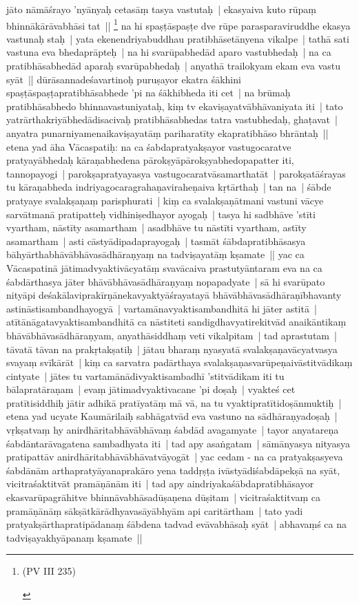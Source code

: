 \documentclass[article,12pt,a4paper]{memoir}
\begin{document}
	  \pstart jāto nāmāśrayo 'nyānyaḥ cetasāṃ tasya vastutaḥ | ekasyaiva kuto rūpaṃ bhinnākārāvabhāsi tat || \footnote{\begin{english}(PV III 235)\end{english}} \label{thakur75-60.29} na hi spaṣṭāspaṣṭe dve rūpe parasparaviruddhe ekasya vastunaḥ staḥ | yata ekenendriyabuddhau pratibhāsetānyena vikalpe | tathā sati vastuna eva bhedaprāpteḥ | na hi svarūpabhedād aparo vastubhedaḥ | na ca pratibhāsabhedād aparaḥ svarūpabhedaḥ | anyathā trailokyam ekam eva vastu syāt || \label{thakur75-61.3} dūrāsannadeśavartinoḥ puruṣayor ekatra śākhini spaṣṭāspaṣṭapratibhāsabhede 'pi na śākhibheda iti cet | na brūmaḥ pratibhāsabhedo bhinnavastuniyataḥ, kiṃ tv ekaviṣayatvābhāvaniyata iti | tato yatrārthakriyābhedādisacivaḥ pratibhāsabhedas tatra vastubhedaḥ, ghaṭavat | anyatra punarniyamenaikaviṣayatāṃ pariharatīty ekapratibhāso bhrāntaḥ || \label{thakur75-61.7} etena yad āha Vācaspatiḥ: na ca śabdapratyakṣayor vastugocaratve pratyayābhedaḥ kāraṇabhedena pārokṣyāpārokṣyabhedopapatter iti, tannopayogi | parokṣapratyayasya vastugocaratvāsamarthatāt | parokṣatāśrayas tu kāraṇabheda indriyagocaragrahaṇaviraheṇaiva kṛtārthaḥ | tan na | śābde pratyaye svalakṣaṇaṃ parisphurati | kiṃ ca svalakṣaṇātmani vastuni vācye sarvātmanā pratipatteḥ vidhiniṣedhayor ayogaḥ | tasya hi sadbhāve 'stīti vyartham, nāstīty asamartham | asadbhāve tu nāstīti vyartham, astīty asamartham | asti cāstyādipadaprayogaḥ | tasmāt śābdapratibhāsasya bāhyārthabhāvābhāvasādhāraṇyaṃ na tadviṣayatāṃ kṣamate || \label{thakur75-61.15} yac ca Vācaspatinā jātimadvyaktivācyatāṃ svavācaiva prastutyāntaram eva na ca śabdārthasya jāter bhāvābhāvasādhāraṇyaṃ nopapadyate | sā hi svarūpato nityāpi deśakālaviprakīrṇānekavyaktyāśrayatayā bhāvābhāvasādhāraṇībhavanty astināstisambandhayogyā | vartamānavyaktisambandhitā hi jāter astitā | atītānāgatavyaktisambandhitā ca nāstiteti sandigdhavyatirekitvād anaikāntikaṃ bhāvābhāvasādhāraṇyam, anyathāsiddhaṃ veti vikalpitam | tad aprastutam | tāvatā tāvan na prakṛtakṣatiḥ | jātau bharaṃ nyasyatā svalakṣaṇavācyatvasya svayaṃ svīkārāt | kiṃ ca sarvatra padārthaya svalakṣaṇasvarūpeṇaivāstitvādikaṃ cintyate | jātes tu vartamānādivyaktisambadhī 'stitvādikam iti tu bālapratāraṇam | evaṃ jātimadvyaktivacane 'pi doṣaḥ | vyakteś cet pratītisiddhiḥ jātir adhikā pratīyatāṃ mā vā, na tu vyaktipratītidoṣānmuktiḥ | \label{thakur75-61.25} etena yad ucyate Kaumārilaiḥ sabhāgatvād eva vastuno na sādhāraṇyadoṣaḥ | vṛkṣatvaṃ hy anirdhāritabhāvābhāvaṃ śabdād avagamyate | tayor anyatareṇa śabdāntarāvagatena sambadhyata iti | tad apy asaṅgatam | sāmānyasya nityasya pratipattāv anirdhāritabhāvābhāvatvāyogāt | \label{thakur75-62.1} yac cedam - na ca pratyakṣasyeva śabdānām arthapratyāyanaprakāro yena taddṛṣṭa ivāstyādiśabdāpekṣā na syāt, vicitraśaktitvāt pramāṇānām iti | tad apy aindriyakaśābdapratibhāsayor ekasvarūpagrāhitve bhinnāvabhāsadūṣaṇena dūṣitam | vicitraśaktitvaṃ ca pramāṇānāṃ sākṣātkārādhyavasāyābhyām api caritārtham | tato yadi pratyakṣārthapratipādanaṃ śābdena tadvad evāvabhāsaḥ syāt | abhavaṃś ca na tadviṣayakhyāpanaṃ kṣamate || 
\end{document}
